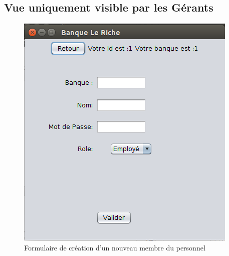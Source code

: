 \subsection{Vue uniquement visible par les Gérants}

\begin{figure}[H]
\begin{center}

   \caption{\label{} Formulaire de création d'un nouveau membre du personnel}
   \includegraphics[scale=0.4]{images/CreerPersonnel.png}
   \centering
 \end{center}
\end{figure}
